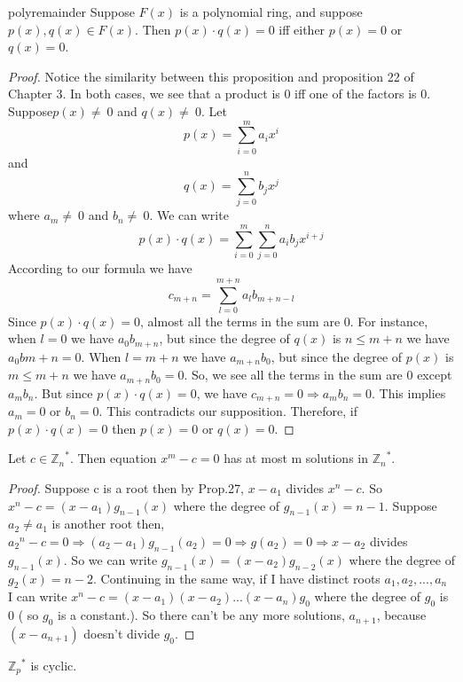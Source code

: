 \begin {prop}{polyremainder}
Suppose $F(x)$ is a polynomial ring, and suppose $p(x),  q(x) \in F(x)$. Then $p(x) \cdot q(x)=0$ iff either $p(x)=0$ or $q(x)=0$.
\end {prop}
\begin {proof}
Notice the similarity between this proposition and proposition 22 of Chapter 3. In both cases, we see that a product is 0 iff one of the factors is 0.
Suppose$ p(x)\neq\ 0$ and  $ q(x)\neq\ 0$.
Let \[p(x) =  \sum_{i=0}^{m} a_i x^i\]  and \[ q(x) =  \sum_{j=0}^{n} b_j x^j\] where $a_m \neq\ 0$ and $b_n\neq\ 0$.
We can write \[p(x) \cdot q(x) = \sum_{i=0}^{m}\sum_{j=0}^{n}a_i b_j x^{i+j}\]
According to our formula we have \[c_{m+n} =  \sum_{l=0}^{m+n}a_l b_{m+n-l}\]
Since $p(x) \cdot q(x) =0$, almost all the terms in the sum are 0. For instance, when $l=0$ we have $a_0 b_{m+n}$, but since the degree of $q(x)$ is $n \leq m+n$ we have $a_0 b{m+n}=0$.
When $l=m+n$ we have $a_{m+n} b_0$, but since the degree of $p(x)$ is $m \leq m+n$ we have $a_{m+n} b_0=0$.
So, we see all the terms  in the sum are 0 except $a_m b_n$. But since $p(x) \cdot q(x) = 0$, we have $c_{m+n} = 0 \Rightarrow  a_m b_n =0$. This implies $a_m=0$ or $b_n=0$.
This contradicts our supposition. Therefore, if $p(x) \cdot q(x)=0$ then $p(x)=0$ or $q(x)=0$.
\end{proof}

\begin {prop}{}
Let $c \in  {\mathbb{Z}_n}^*$. Then equation $x^m-c=0$ has at most m solutions in  ${\mathbb{Z}_n}^*$.
\end {prop}



\begin {proof}
Suppose c is a root then by Prop.27, $x-a_1$ divides $x^n-c$. So $x^n-c = (x-a_1) g_{n-1}(x)$ where the degree of $g_{n-1}(x)=n-1$. Suppose $a_2 \neq a_1$ is another root then, ${a_2}^n - c = 0
 \Rightarrow (a_2 - a_1)g_{n-1}(a_2) = 0
 \Rightarrow g(a_2) = 0
 \Rightarrow x - a_2$ divides $g_{n-1}(x)$. So we can write $g_{n - 1}(x) = (x-a_2)g_{n-2}(x)$ where the degree of $g_2(x) = n-2$. Continuing in the same way, if I have distinct roots $a_1,a_2,...,a_n$ I can write $x^n - c = (x - a_1)(x - a_2)...(x - a_n)g_0$ where the degree of $g_0$ is 0 ( so $g_0$ is a constant.). So there can't be any more solutions, $a_{n+1}$, because $(x-a_{n+1})$ doesn't divide $g_0$.
\end {proof}

\begin {prop}{}
 ${\mathbb{Z}_p}^*$ is cyclic.
\end {prop}

